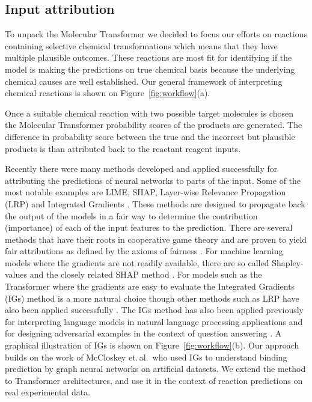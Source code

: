 \subsection{Input attribution} \label{subsec:input_attribution}
To unpack the Molecular Transformer we decided to focus our efforts on reactions containing selective chemical transformations which means that they have multiple plausible outcomes. These reactions are most fit for identifying if the model is making the predictions on true chemical basis because the underlying chemical causes are well established. Our general framework of interpreting chemical reactions is shown on Figure~\ref{fig:workflow}(a).

Once a suitable chemical reaction with two possible target molecules is chosen the Molecular Transformer probability scores of the products are generated. The difference in probability score between the true and the incorrect but plausible products is than attributed back to the reactant reagent inputs.

Recently there were many methods developed and applied successfully for attributing the predictions of neural networks to parts of the input. Some of the most notable examples are LIME, SHAP, Layer-wise Relevance Propagation (LRP) and Integrated Gradients \cite{Ribeiro2016WhyClassifier, Lundberg2017APredictions, Montavon2018MethodsNetworks, Sundararajan2017}. These methods are designed to propagate back the output of the models in a fair way to determine the contribution (importance) of each of the input features to the prediction. There are several methods that have their roots in cooperative game theory and are proven to yield fair attributions as defined by the axioms of fairness \cite{Sundararajan2017}. For machine learning models where the gradients are not readily available, there are so called Shapley-values and the closely related SHAP method \cite{Lundberg2017APredictions}. For models such as the Transformer where the gradients are easy to evaluate the Integrated Gradients (IGs) method is a more natural choice \cite{Sundararajan2017} though other methods such as LRP have also been applied successfully \cite{Karpov2020}. The IGs method has also been applied previously for interpreting language models in natural language processing applications and for designing adversarial examples in the context of question answering \cite{mudrakarta2018did}. A graphical illustration of IGs is shown on Figure~\ref{fig:workflow}(b). Our approach builds on the work of McCloskey et.\,al.\,\cite{McCloskey2019} who used IGs to understand binding prediction by graph neural networks on artificial datasets. We extend the method to Transformer architectures, and use it in the context of reaction predictions on real experimental data.

